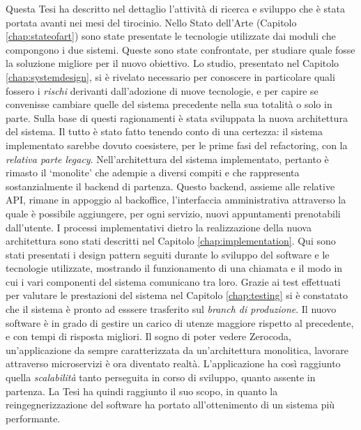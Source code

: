 Questa Tesi ha descritto nel dettaglio l'attività di ricerca e sviluppo che è stata portata avanti nei mesi del tirocinio. Nello Stato dell'Arte (Capitolo \ref{chap:stateofart}) sono state presentate le tecnologie utilizzate dai moduli che compongono i due sistemi. Queste sono state confrontate, per studiare quale fosse la soluzione migliore per il nuovo obiettivo. Lo studio, presentato nel Capitolo \ref{chap:systemdesign}, si è rivelato necessario per conoscere in particolare quali fossero i \emph{rischi} derivanti dall'adozione di nuove tecnologie, e per capire se convenisse cambiare quelle del sistema precedente nella sua totalità o solo in parte. Sulla base di questi ragionamenti è stata sviluppata la nuova architettura del sistema. Il tutto è stato fatto tenendo conto di una certezza: il sistema implementato sarebbe dovuto coesistere, per le prime fasi del refactoring, con la \emph{relativa parte legacy}. Nell'architettura del sistema implementato, pertanto è rimasto il `monolite' che adempie a diversi compiti e che rappresenta sostanzialmente il backend di partenza. Questo backend, assieme alle relative API, rimane in appoggio al backoffice, l'interfaccia amministrativa attraverso la quale è possibile aggiungere, per ogni servizio, nuovi appuntamenti prenotabili dall'utente. I processi implementativi dietro la realizzazione della nuova architettura sono stati descritti nel Capitolo \ref{chap:implementation}. Qui sono stati presentati i design pattern seguiti durante lo sviluppo del software e le tecnologie utilizzate, mostrando il funzionamento di una chiamata e il modo in cui i vari componenti del sistema comunicano tra loro. Grazie ai test effettuati per valutare le prestazioni del sistema nel Capitolo \ref{chap:testing} si è constatato che il sistema è pronto ad esssere trasferito sul \emph{branch di produzione}. Il nuovo software è in grado di gestire un carico di utenze maggiore rispetto al precedente, e con tempi di risposta migliori. Il sogno di poter vedere Zerocoda, un'applicazione da sempre caratterizzata da un'architettura monolitica, lavorare attraverso microservizi è ora diventato realtà. L'applicazione ha così raggiunto quella \emph{scalabilità} tanto perseguita in corso di sviluppo, quanto assente in partenza. La Tesi ha quindi raggiunto il suo scopo, in quanto la reingegnerizzazione del software ha portato all'ottenimento di un sistema più performante.
